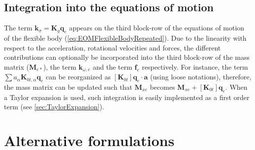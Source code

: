 \documentclass[wes, manuscript]{copernicus}
\renewcommand{\v}[1]{\boldsymbol{#1}}
\newcommand{\m}[1]{\boldsymbol{#1}}
\begin{document}


\subsection{Integration into the equations of motion}
The term $\v{k}_\sigma = \m{K}_g \v{q}_e$ appears on the third block-row of the equations of motion of the flexible body (\autoref{eq:EOMFlexibleBodyRepeated}).
Due to the linearity with respect to the acceleration, rotational velocities and forces, the different contributions can optionally be incorporated into the third block-row of the mass matrix ($\m{M}_{e*}$), the term $\v{k}_{\omega,e}$ and the term $\v{f}_e$ respectively. For instance, the term $\sum a_\alpha \m{K}_{0t,\alpha} \v{q}_e$ can be reorganized as $[\m{K}_{0t}]\v{q}_e \cdot \v{a}$ (using loose notations), therefore, the mass matrix can be updated such that $\m{M}_{xe}$ becomes $\m{M}_{xe}+[\m{K}_{0t}]\v{q}_e$. When a Taylor expansion is used, such integration is easily implemented as a first order term (see \autoref{sec:TaylorExpansion}).









\section{Alternative formulations}
\label{sec:AlternativeFormulations}
\end{document}
